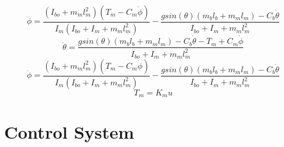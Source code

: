 \documentclass[12pt]{article}
\begin{document}
		\begin{equation}
			\ddot\phi = \frac{(I_{bo}+m_ml_m^2)(T_m-C_m\dot\phi)}{I_m(I_{bo}+I_m+m_ml_m^2)} - \frac{gsin(\theta)(m_bl_b+m_ml_m)-C_b\dot\theta}{I_{bo}+I_m+m_ml_m^2}
		\end{equation}
		\begin{equation}
			\boxed{\ddot\theta = \frac{gsin(\theta)(m_bl_b + m_ml_m) - C_b \dot\theta - T_m + C_m \dot\phi}{I_{bo}+I_m+m_ml_m^2}}
		\end{equation}
		\begin{equation}
			\boxed{\ddot\phi = \frac{(I_{bo}+m_ml_m^2)(T_m-C_m\dot\phi)}{I_m(I_{bo}+I_m+m_ml_m^2)} - \frac{gsin(\theta)(m_bl_b+m_ml_m)-C_b\dot\theta}{I_{bo}+I_m+m_ml_m^2}}
		\end{equation}
		\begin{equation}
			\boxed{T_m = K_m u}
		\end{equation}
	
	\section{Control System}
\end{document}
